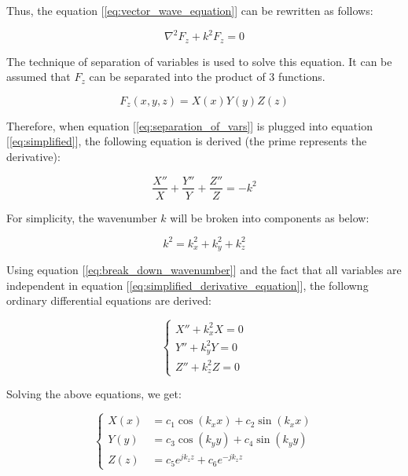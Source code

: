 \documentclass[a4paper,12pt]{report}
\begin{document}
Thus, the equation [\ref{eq:vector_wave_equation}] can be rewritten as follows:

\begin{equation} \label{eq:simplified}
  \nabla ^ 2 F_z + k^2 F_z = 0
\end{equation}

The technique of separation of variables is used to solve this equation.
It can be assumed that $F_z$ can be separated into the product of 3 functions.

\begin{equation} \label{eq:separation_of_vars}
  F_z(x,y,z) = X(x)Y(y)Z(z)
\end{equation}

Therefore, when equation [\ref{eq:separation_of_vars}] is plugged into equation [\ref{eq:simplified}],
the following equation is derived
(the prime represents the derivative):

\begin{equation} \label{eq:simplified_derivative_equation}
  \frac{X''}{X} + \frac{Y''}{Y} + \frac{Z''}{Z} = -k^2
\end{equation}

For simplicity, the wavenumber $k$ will be broken into components as below:

\begin{equation} \label{eq:break_down_wavenumber}
  k^2 = k_x^2 + k_y^2 + k_z^2
\end{equation}

Using equation [\ref{eq:break_down_wavenumber}] and the fact that all variables are
independent in equation [\ref{eq:simplified_derivative_equation}],
the followng ordinary differential equations are derived:

\begin{equation} \label{eq:three_ordinary}
  \left\{
  \begin{alignedat}{3}
    X'' + k_x^2 X = 0 \\
    Y'' + k_y^2 Y = 0 \\
    Z'' + k_z^2 Z = 0
  \end{alignedat}
  \right.
\end{equation}

Solving the above equations, we get:

\begin{equation} \label{eq:three_solved_ordinary}
  \left\{
  \begin{alignedat}{3}
    X(x) &= c_1 \cos (k_x x) + c_2 \sin (k_x x) \\
    Y(y) &= c_3 \cos (k_y y) + c_4 \sin (k_y y) \\
    Z(z) &= c_5 e^{j k_z z} + c_6 e^{-j k_z z}
  \end{alignedat}
  \right.
\end{equation}
\end{document}
